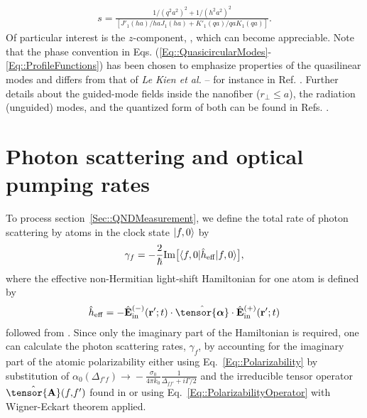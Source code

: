 \documentclass[aps,pra,twocolumn]{revtex4-1} %
\newcommand{\poltens}{\hat{\tensor{\boldsymbol{\alpha}}}}
\newcommand{\charpol}{\alpha_0(\Delta_{f'\!f})}
\begin{document}
\begin{appendix}
	\begin{align}
		s = \frac{1/(q^2 a^2)^{2} + 1/(h^2 a^2)^{2}}{[J'_1(ha)/haJ_1(ha) + K'_1(qa)/qaK_1(qa)]}.
	\end{align}  
Of particular interest is the $z$-component, , which can become appreciable.  Note that the phase convention in Eqs. (\ref{Eq::QuasicircularModes}-\ref{Eq::ProfileFunctions}) has been chosen to emphasize properties of the quasilinear modes and differs from that of \emph{Le Kien et al.} -- for instance in Ref. \cite{le_kien_propagation_2014}.  
Further details about the guided-mode fields inside the nanofiber ($r_\perp\leq a$), the radiation (unguided) modes, and the quantized form of both can be found in Refs. \cite{sondergaard_general_2001, tong_single-mode_2004, kien_field_2004, le_kien_spontaneous_2005, vetsch_eugen_optical_2010}.


\section{Photon scattering and optical pumping rates} \label{Appendix::Rates}	

To process section~\ref{Sec::QNDMeasurement}, we define the total rate of photon scattering by atoms in the clock state $\lvert{f,0}\rangle$ by
	\begin{equation}\label{Eq::gammaf}
		\gamma_{f}=- \frac{2}{\hbar} {\rm Im} \big[ \langle{f,0}\rvert \hat{h}_{\rm eff}\lvert{f,0}\rangle \big] ,
	\end{equation}
where the effective non-Hermitian light-shift Hamiltonian for one atom is defined by
\begin{align}
\hat{h}_{\rm eff} = - \hat{\mathbf{E}}^{(-)}_{\rm in}(\mathbf{r}' ; t ) \cdot \poltens \cdot \hat{\mathbf{E}}^{(+)}_{\rm in}(\mathbf{r}' ;t )
\end{align}
followed from . 
Since only the imaginary part of the Hamiltonian is required, one can calculate the photon scattering rates, $\gamma_{f}$, by accounting for the imaginary part of the atomic polarizability either using Eq.~\eqref{Eq::Polarizability} by substitution of $\charpol \!\rightarrow\! -\frac{\sigma_0}{4\pi k_0}\frac{1}{\Delta_{f\!f'}\!+i\Gamma/2}$ and the irreducible tensor operator $ \hat{\tensor{\mbf{A}}}(f,\!f') $ found in  or using Eq.~\eqref{Eq::PolarizabilityOperator} with Wigner-Eckart theorem applied.  


\end{appendix}
\end{document}
